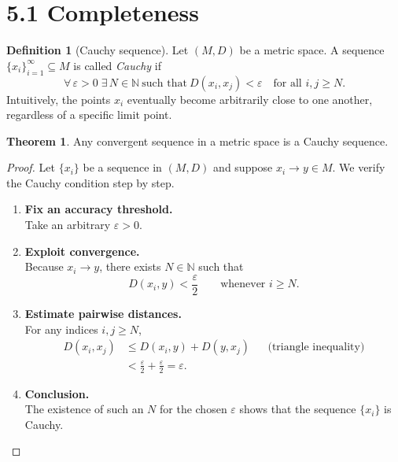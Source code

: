 \documentclass[12pt]{article}
\title{}
\author{Jerich Lee}
\date{\today}
\theoremstyle{definition} %
\newtheorem{theorem}{Theorem}
\newtheorem{definition}{Definition}
\theoremstyle{plain} %
\begin{document}
\maketitle
\section*{5.1 \quad Completeness}

\begin{definition}[Cauchy sequence]
    Let $(M,D)$ be a metric space.  
    A sequence $\{x_i\}_{i=1}^{\infty}\subseteq M$ is called \emph{Cauchy} if
    \[
        \forall\,\varepsilon>0\;\exists\,N\in\mathbb N\ 
        \text{such that}\ 
        D(x_i,x_j)<\varepsilon
        \quad\text{for all }i,j\ge N.
    \]
    Intuitively, the points $x_i$ eventually become arbitrarily close to
    one another, regardless of a specific limit point.
\end{definition}

\begin{theorem}
    Any convergent sequence in a metric space is a Cauchy sequence.
\end{theorem}

\begin{proof}
    Let $\{x_i\}$ be a sequence in $(M,D)$ and suppose $x_i\to y\in M$.
    We verify the Cauchy condition step by step.

    \begin{enumerate}
        \item[\textbf{1.}] \textbf{Fix an accuracy threshold.}\\
              Take an arbitrary $\varepsilon>0$.

        \item[\textbf{2.}] \textbf{Exploit convergence.}\\
              Because $x_i\to y$, there exists
              $N\in\mathbb N$ such that
              \[
                  D(x_i,y)<\frac{\varepsilon}{2}
                  \qquad\text{whenever }i\ge N.
              \]

        \item[\textbf{3.}] \textbf{Estimate pairwise distances.}\\
              For any indices $i,j\ge N$,
              \begin{align}
                  D(x_i,x_j)
                  &\le D(x_i,y)+D(y,x_j)
                      &&\text{(triangle inequality)}\\[4pt]
                  &<\frac{\varepsilon}{2}+\frac{\varepsilon}{2}
                      =\varepsilon.
              \end{align}

        \item[\textbf{4.}] \textbf{Conclusion.}\\
              The existence of such an $N$ for the chosen $\varepsilon$
              shows that the sequence $\{x_i\}$ is Cauchy.
    \end{enumerate}
\end{proof}
\end{document}
